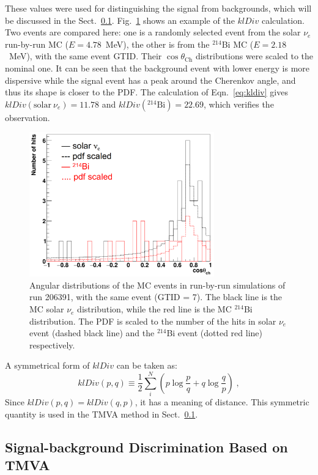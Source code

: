 These values were used for distinguishing the signal from backgrounds, which will be discussed in the Sect.~\ref{sect:tmva}. Fig.~\ref{kLdiv_example} shows an example of the $klDiv$ calculation. Two events are compared here: one is a randomly selected event from the solar $\nu_e$ run-by-run MC ($E=4.78$~MeV), the other is from the $^{214}$Bi MC ($E=2.18$~MeV), with the same event GTID. Their $\cos\theta_\mathrm{Ch}$ distributions were scaled to the nominal one. It can be seen that the background event with lower energy is more dispersive while the signal event has a peak around the Cherenkov angle, and thus its shape is closer to the PDF. The calculation of Eqn.~\ref{eq:kldiv} gives $klDiv(\mathrm{solar}~\nu_e)=11.78$ and $klDiv(^{214}\mathrm{Bi})=22.69$, which verifies the observation.

\begin{figure}[!htb]
	\centering
	\includegraphics[width=8cm]{klDiv_example.png}
	\caption[Angular distributions of the MC events in run-by-run simulations.]{Angular distributions of the MC events in run-by-run simulations of run 206391, with the same event (GTID = 7). The black line is the MC solar $\nu_e$ distribution, while the red line is the MC $^{214}$Bi distribution. The PDF is scaled to the number of the hits in solar $\nu_e$ event (dashed black line) and the $^{214}$Bi event (dotted red line) respectively. \label{kLdiv_example}}
\end{figure}

A symmetrical form of $klDiv$ can be taken as:
\begin{equation}\label{eq:symKlDiv}
klDiv(p,q) \equiv \frac{1}{2}\sum_{i}^N (p\log{\frac{p}{q}}+q\log{\frac{q}{p}})\; ,
\end{equation}
Since $klDiv(p,q)=klDiv(q,p)$, it has a meaning of distance. This symmetric quantity is used in the TMVA method in Sect.~\ref{sect:tmva}.

\subsection{Signal-background Discrimination Based on TMVA}\label{sect:tmva}

